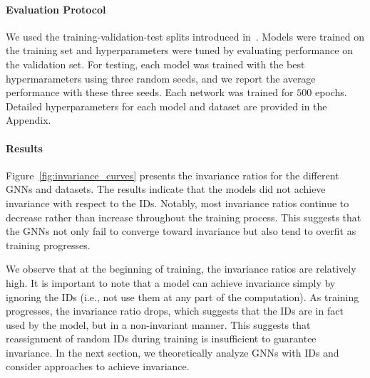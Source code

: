 \paragraph{Evaluation Protocol}
We used the training-validation-test splits introduced in~\cite{ogb}. Models were trained on the training set and hyperparameters were tuned by evaluating performance on the validation set. For testing, each model was trained with the best hypermarameters using three random seeds, and we report the average performance with these three seeds. Each network was trained for $500$ epochs. Detailed hyperparameters for each model and dataset are provided in the Appendix.

\paragraph{Results}
Figure~\ref{fig:invariance_curves} presents the invariance ratios for the different GNNs and datasets. The results indicate that the models did not achieve invariance with respect to the IDs. Notably, most invariance ratios continue to decrease rather than increase throughout the training process. This suggests that the GNNs not only fail to converge toward invariance but also tend to overfit as training progresses.


We observe that at the beginning of training, the invariance ratios are relatively high. It is important to note that a model can achieve invariance simply by ignoring the IDs (i.e., not use them at any part of the computation). As training progresses, the invariance ratio drops, which suggests that the IDs are in fact used by the model, but in a non-invariant manner. This suggests that reassignment of random IDs during training is insufficient to guarantee invariance. In the next section, we theoretically analyze GNNs with IDs and consider approaches to achieve invariance.